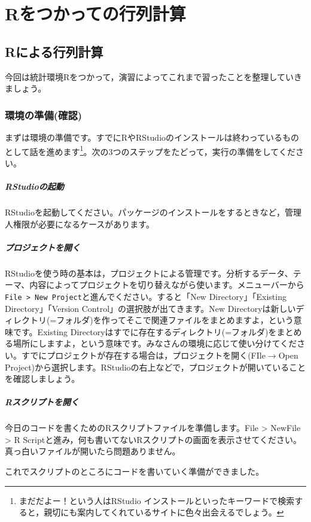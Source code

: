 \documentclass{ltjsbook}
\begin{document}
\chapter{Rをつかっての行列計算}
\label{x09_matrixOnR}
\section{Rによる行列計算}

今回は統計環境Rをつかって，演習によってこれまで習ったことを整理していきましょう。
\subsection{環境の準備(確認)}
まずは環境の準備です。すでにRやRStudioのインストールは終わっているものとして話を進めます\footnote{まだだよー！という人はRStudio インストールといったキーワードで検索すると，親切にも案内してくれているサイトに色々出会えるでしょう。}。次の3つのステップをたどって，実行の準備をしてください。
\paragraph{RStudioの起動}RStudioを起動してください。パッケージのインストールをするときなど，管理人権限が必要になるケースがあります。
\paragraph{プロジェクトを開く}\label{UnderProject}RStudioを使う時の基本は，プロジェクトによる管理です。分析するデータ、テーマ、内容によってプロジェクトを切り替えながら使います。メニューバーから\verb|File > New Project|と進んでください。すると「New Directory」「Existing Directory」「Version Control」の選択肢が出てきます。New Directoryは新しいディレクトリ(=フォルダ)を作ってそこで関連ファイルをまとめますよ，という意味です。Existing Directoryはすでに存在するディレクトリ(=フォルダ)をまとめる場所にしますよ，という意味です。みなさんの環境に応じて使い分けてください。すでにプロジェクトが存在する場合は，プロジェクトを開く(FIle$\to$Open Project)から選択します。RStudioの右上などで，プロジェクトが開いていることを確認しましょう。
\paragraph{Rスクリプトを開く}今日のコードを書くためのRスクリプトファイルを準備します。File > NewFile > R Scriptと進み，何も書いてないRスクリプトの画面を表示させてください。真っ白いファイルが開いたら問題ありません。

これでスクリプトのところにコードを書いていく準備ができました。
\end{document}
